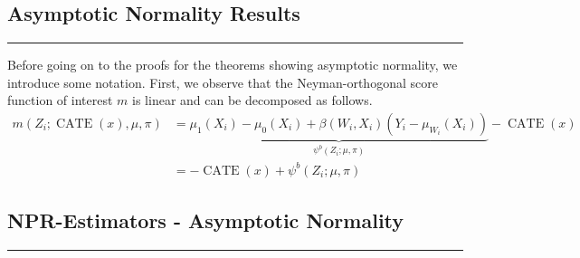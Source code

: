 \subsection{Asymptotic Normality Results}
\hrule

Before going on to the proofs for the theorems showing asymptotic normality, we introduce some notation.
First, we observe that the Neyman-orthogonal score function of interest $m$ is linear and can be decomposed as follows.
\begin{equation}
    \begin{aligned}
        m\left(Z_{i}; \operatorname{CATE}(x), \mu, \pi\right)
		  & = \underbrace{\mu_1\left(X_{i}\right) - \mu_0\left(X_{i}\right) + \beta\left(W_{i}, X_{i}\right)\left(Y_{i} - \mu_{W_{i}}\left(X_{i}\right)\right)}_{\psi^{b}\left(Z_{i}; \mu, \pi\right)} 
          - \operatorname{CATE}\left(x\right)\\
          & = - \operatorname{CATE}\left(x\right) + \psi^{b}\left(Z_{i}; \mu, \pi\right)
    \end{aligned}
\end{equation}  

\subsection{NPR-Estimators - Asymptotic Normality}
\hrule

